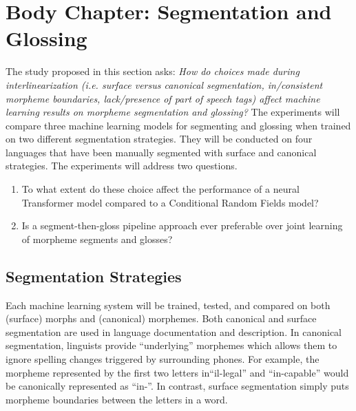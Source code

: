 \section{Body Chapter: Segmentation and Glossing}
\label{sec:seggls}

The study proposed in this section asks: \emph{How do choices made during interlinearization (i.e. surface versus canonical segmentation, in/consistent morpheme boundaries, lack/presence of part of speech tags) affect machine learning results on morpheme segmentation and glossing?} The experiments will compare three machine learning models for segmenting and glossing when trained on two different segmentation strategies. They will be conducted on four languages that have been manually segmented with surface and canonical strategies. 
The experiments will address two questions.

\begin{enumerate}
    \item To what extent do these choice affect the performance of a neural Transformer model compared to a Conditional Random Fields model? 
    \item Is a segment-then-gloss pipeline approach ever preferable over joint learning of morpheme segments and glosses?
\end{enumerate}
    
\subsection{Segmentation Strategies}    
Each machine learning system will be trained, tested, and compared on both (surface) morphs and (canonical) morphemes. Both canonical and surface segmentation are used in language documentation and description. In canonical segmentation, linguists provide ``underlying'' morphemes which allows them to ignore spelling changes triggered by surrounding phones. For example, the morpheme represented by the first two letters in``il-legal'' and ``in-capable'' would be canonically represented as ``in-''. In contrast, surface segmentation simply puts morpheme boundaries between the letters in a word. 

